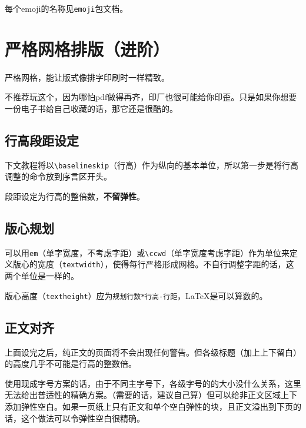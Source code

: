 \documentclass[10pt,openany]{book}
\begin{document}
\begin{sloppypar}
    

    每个emoji的名称见\texttt{emoji}包文档。

    \chapter{严格网格排版（进阶）}

    严格网格，能让版式像排字印刷时一样精致。

    不推荐玩这个，因为哪怕pdf做得再齐，印厂也很可能给你印歪。只是如果你想要一份电子书给自己收藏的话，那它还是很酷的。

    \section{行高段距设定}

    下文教程将以\texttt{\textbackslash{}baselineskip}（行高）作为纵向的基本单位，所以第一步是将行高调整的命令放到序言区开头。

    

    段距设定为行高的整倍数，\textbf{不留弹性}。

    

    \section{版心规划}

    可以用\texttt{em}（单字宽度，不考虑字距）或\texttt{\textbackslash{}ccwd}（单字宽度考虑字距）作为单位来定义版心的宽度（\texttt{textwidth}），使得每行严格形成网格。不自行调整字距的话，这两个单位是一样的。

    版心高度（\texttt{textheight}）应为\texttt{规划行数*行高-行距}，{\LaTeX}是可以算数的。

    

    \section{正文对齐}

    上面设完之后，纯正文的页面将不会出现任何警告。但各级标题（加上上下留白）的高度几乎不可能是行高的整数倍。

    使用现成字号方案的话，由于不同主字号下，各级字号的的大小没什么关系，这里无法给出普适性的精确方案。（需要的话，建议自己算）但可以给非正文区域上下添加弹性空白。如果一页纸上只有正文和单个空白弹性的块，且正文溢出到下页的话，这个做法可以令弹性空白很精确。


\end{sloppypar}
\end{document}
